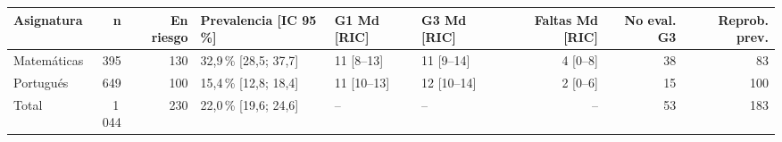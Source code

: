 \begin{tabular}{lrrlllrrr}
\toprule
Asignatura & n & En riesgo & Prevalencia [IC 95\,\%] & G1 Md [RIC] & G3 Md [RIC] & Faltas Md [RIC] & No eval. G3 & Reprob. prev. \\
\midrule
Matemáticas & 395 & 130 & 32,9\,\% [28,5; 37,7] & 11 [8–13] & 11 [9–14] & 4 [0–8] & 38 & 83 \\
Portugués & 649 & 100 & 15,4\,\% [12,8; 18,4] & 11 [10–13] & 12 [10–14] & 2 [0–6] & 15 & 100 \\
Total & 1\,044 & 230 & 22,0\,\% [19,6; 24,6] & -- & -- & -- & 53 & 183 \\
\bottomrule
\end{tabular}
